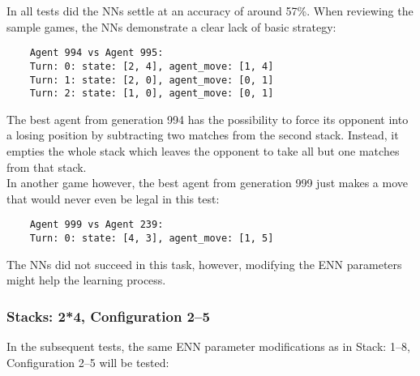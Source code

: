    In all tests did the NNs settle at an accuracy of around 57\%.
    When reviewing the sample games, the NNs demonstrate a clear lack of basic strategy:
    \begin{verbatim}
    Agent 994 vs Agent 995:
    Turn: 0: state: [2, 4], agent_move: [1, 4]
    Turn: 1: state: [2, 0], agent_move: [0, 1]
    Turn: 2: state: [1, 0], agent_move: [0, 1]
    \end{verbatim}
    The best agent from generation 994 has the possibility to force its opponent into a losing position by subtracting two matches from the second stack.
    Instead, it empties the whole stack which leaves the opponent to take all but one matches from that stack.
    \\
    In another game however, the best agent from generation 999 just makes a move that would never even be legal in this test:
    \begin{verbatim}
    Agent 999 vs Agent 239:
    Turn: 0: state: [4, 3], agent_move: [1, 5]
    \end{verbatim}
    The NNs did not succeed in this task, however, modifying the ENN parameters might help the learning process.

    \subsubsection{Stacks: 2*4, Configuration 2--5}
    In the subsequent tests, the same ENN parameter modifications as in Stack: 1--8, Configuration 2--5 will be tested: